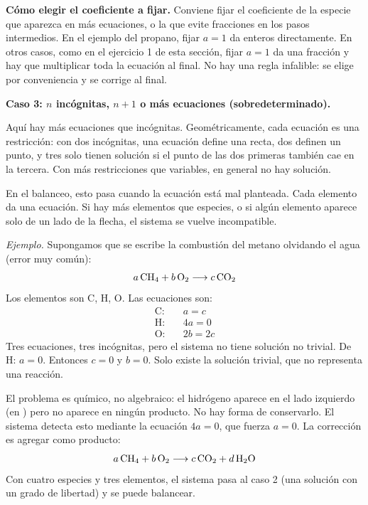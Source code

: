 \begin{notafija}
\textbf{Cómo elegir el coeficiente a fijar.} Conviene fijar el
coeficiente de la especie que aparezca en más ecuaciones, o la
que evite fracciones en los pasos intermedios. En el ejemplo del
propano, fijar $a=1$ da enteros directamente. En otros casos,
como en el ejercicio 1 de esta sección, fijar $a=1$ da una
fracción y hay que multiplicar toda la ecuación al final. No hay
una regla infalible: se elige por conveniencia y se corrige al
final.
\end{notafija}

\medskip
\textbf{Caso 3: $n$ incógnitas, $n+1$ o más ecuaciones
(sobredeterminado).}

Aquí hay más ecuaciones que incógnitas. Geométricamente, cada
ecuación es una restricción: con dos incógnitas, una ecuación
define una recta, dos definen un punto, y tres solo tienen
solución si el punto de las dos primeras también cae en la
tercera. Con más restricciones que variables, en general no hay
solución.

En el balanceo, esto pasa cuando la ecuación está mal planteada.
Cada elemento da una ecuación. Si hay más elementos que especies,
o si algún elemento aparece solo de un lado de la flecha, el
sistema se vuelve incompatible.

\textit{Ejemplo.} Supongamos que se escribe la combustión del
metano olvidando el agua (error muy común):
\[
a\,\ce{CH4} + b\,\ce{O2} \longrightarrow c\,\ce{CO2}
\]
Los elementos son C, H, O. Las ecuaciones son:
\begin{align*}
\text{C:} &\quad a = c \\
\text{H:} &\quad 4a = 0 \\
\text{O:} &\quad 2b = 2c
\end{align*}
Tres ecuaciones, tres incógnitas, pero el sistema no tiene
solución no trivial. De H: $a = 0$. Entonces $c = 0$ y $b = 0$.
Solo existe la solución trivial, que no representa una reacción.

El problema es químico, no algebraico: el hidrógeno aparece en el
lado izquierdo (en ) pero no aparece en ningún producto.
No hay forma de conservarlo. El sistema detecta esto mediante la
ecuación $4a = 0$, que fuerza $a = 0$. La corrección es agregar
 como producto:
\[
a\,\ce{CH4} + b\,\ce{O2} \longrightarrow c\,\ce{CO2} + d\,\ce{H2O}
\]
Con cuatro especies y tres elementos, el sistema pasa al caso 2
(una solución con un grado de libertad) y se puede balancear.


